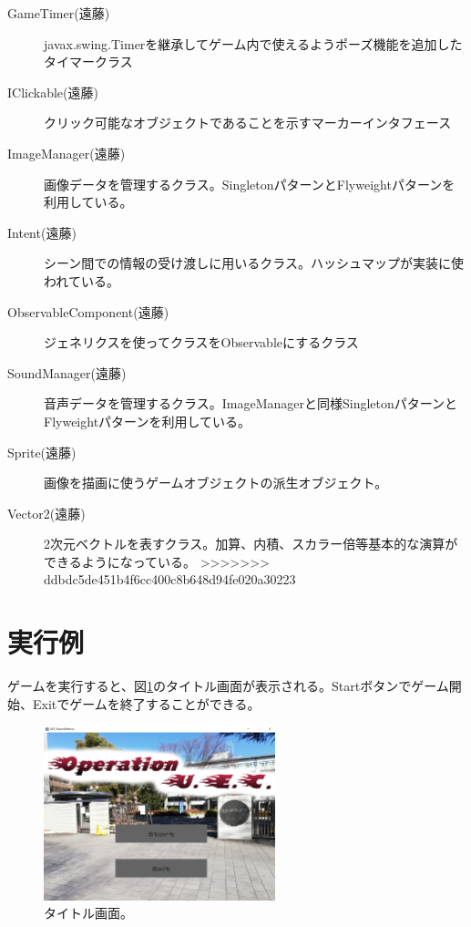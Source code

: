 \documentclass[11pt,a4j]{jarticle}
\begin{document}
\begin{description}
    \item[GameTimer(遠藤)] javax.swing.Timerを継承してゲーム内で使えるようポーズ機能を追加したタイマークラス
    \item[IClickable(遠藤)] クリック可能なオブジェクトであることを示すマーカーインタフェース
    \item[ImageManager(遠藤)] 画像データを管理するクラス。SingletonパターンとFlyweightパターンを利用している。
    \item[Intent(遠藤)] シーン間での情報の受け渡しに用いるクラス。ハッシュマップが実装に使われている。
    \item[ObservableComponent(遠藤)] ジェネリクスを使ってクラスをObservableにするクラス
    \item[SoundManager(遠藤)] 音声データを管理するクラス。ImageManagerと同様SingletonパターンとFlyweightパターンを利用している。
    \item[Sprite(遠藤)] 画像を描画に使うゲームオブジェクトの派生オブジェクト。
    \item[Vector2(遠藤)] 2次元ベクトルを表すクラス。加算、内積、スカラー倍等基本的な演算ができるようになっている。
>>>>>>> ddbdc5de451b4f6cc400c8b648d94fe020a30223
\end{description}

\section{実行例}

ゲームを実行すると、図\ref{fig:title}のタイトル画面が表示される。Startボタンでゲーム開始、Exitでゲームを終了することができる。

\begin{figure}[H]
    \begin{center}
        \leavevmode
        \includegraphics[width=0.6\textwidth]{title.png}
        \caption{タイトル画面。}
        \label{fig:title}
    \end{center}
\end{figure}
\end{document}
